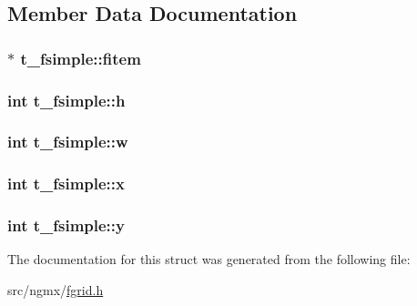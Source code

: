 \subsection{\-Member \-Data \-Documentation}
\hypertarget{structt__fsimple_a17a2cb9ea780b6153c34846e1e1762d0}{
\subsubsection[{fitem}]{$\ast$ {\bf t\-\_\-fsimple\-::fitem}}}\label{structt__fsimple_a17a2cb9ea780b6153c34846e1e1762d0}
\hypertarget{structt__fsimple_ae1cc724721ce7d919a126f6aea73f5b9}{
\subsubsection[{h}]{\setlength{\rightskip}{0pt plus 5cm}int {\bf t\-\_\-fsimple\-::h}}}\label{structt__fsimple_ae1cc724721ce7d919a126f6aea73f5b9}
\hypertarget{structt__fsimple_aa0a6be92aa6170a4cbd7b3bc5bbb109b}{
\subsubsection[{w}]{\setlength{\rightskip}{0pt plus 5cm}int {\bf t\-\_\-fsimple\-::w}}}\label{structt__fsimple_aa0a6be92aa6170a4cbd7b3bc5bbb109b}
\hypertarget{structt__fsimple_aaeeae2ff3b1a1a965b8020da30a44535}{
\subsubsection[{x}]{\setlength{\rightskip}{0pt plus 5cm}int {\bf t\-\_\-fsimple\-::x}}}\label{structt__fsimple_aaeeae2ff3b1a1a965b8020da30a44535}
\hypertarget{structt__fsimple_a9631da57036ef58c074ced17f3f29c8d}{
\subsubsection[{y}]{\setlength{\rightskip}{0pt plus 5cm}int {\bf t\-\_\-fsimple\-::y}}}\label{structt__fsimple_a9631da57036ef58c074ced17f3f29c8d}


\-The documentation for this struct was generated from the following file\-:\begin{DoxyCompactItemize}
\item 
src/ngmx/\hyperlink{fgrid_8h}{fgrid.\-h}\end{DoxyCompactItemize}
